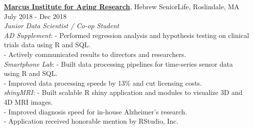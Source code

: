 \documentclass[a4paper]{article}
\newcommand{\mybullet}{
	\indent 
  \textbullet \hspace*{2mm}
}
\begin{document}

  \noindent
  \textbf{\href{https://www.marcusinstituteforaging.org/}{Marcus Institute for Aging Research}}, 
  Hebrew SeniorLife, Roslindale, MA 
  \hfill July 2018 - Dec 2018 \\
        \textit{Junior Data Scientist / Co-op Student} \\
        \mybullet \textit{AD Supplement}: 
        \hspace*{3.7 mm} - Performed regression analysis and hypothesis testing
        on clinical trials data using R and SQL. \\
        \hspace*{37.5 mm} - Actively communicated results to directors and researchers.  \\
        \mybullet \textit{Smartphone Lab}: 
        \hspace* {2.3 mm} - Built data processing pipelines for time-series sensor data using R and SQL. \\
        \hspace*{37.5 mm} - Improved data processing speeds by 13\% and cut licensing costs. \\ 
        \mybullet \textit{shinyMRI}: 
        \hspace* {12.7 mm} - Built scalable R shiny application and modules to visualize 3D and 4D MRI images. \\
        \hspace*{37.5 mm} - Improved diagnosis speed for in-house Alzheimer's research. \\
        \hspace*{37.5 mm} - Application received honorable mention by RStudio, Inc. \\
        
	
\end{document}
